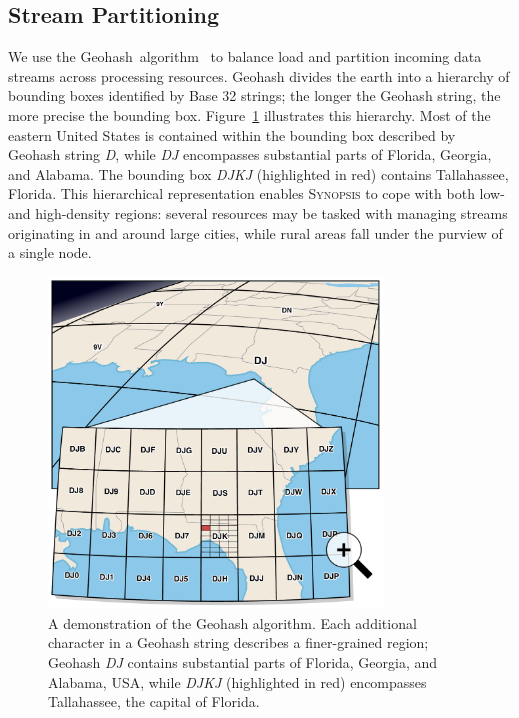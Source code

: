 \subsection{Stream Partitioning}
We use the Geohash~algorithm~\cite{geohash} to balance load and partition incoming data streams across processing resources. Geohash divides the earth into a hierarchy of bounding boxes identified by Base 32 strings; the longer the Geohash string, the more precise the bounding box. Figure~\ref{fig:geohash} illustrates this hierarchy. Most of the eastern United States is contained within the bounding box described by Geohash string \emph{D}, while \emph{DJ} encompasses substantial parts of Florida, Georgia, and Alabama. The bounding box \emph{DJKJ} (highlighted in red) contains Tallahassee, Florida. This hierarchical representation enables \textsc{Synopsis} to cope with both low- and high-density regions: several resources may be tasked with managing streams originating in and around large cities, while rural areas fall under the purview of a single node.

\begin{figure}[b!]
    \centerline{\includegraphics[width=3.5in]{figures/geohash.pdf}}
    \caption{A demonstration of the Geohash algorithm. Each additional character in a Geohash string describes a finer-grained region; Geohash \emph{DJ} contains substantial parts of Florida, Georgia, and Alabama, USA, while \emph{DJKJ} (highlighted in red) encompasses Tallahassee, the capital of Florida.}
    \label{fig:geohash}
\end{figure}

